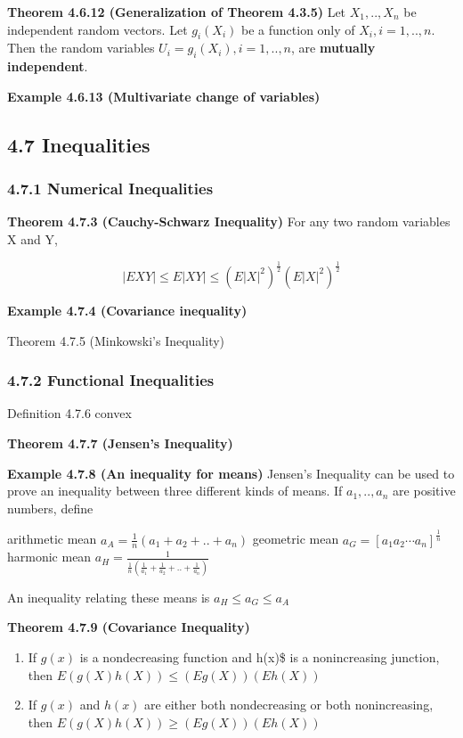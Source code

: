 \documentclass[6pt,Portrait]{article}
\begin{document}
\textbf{Theorem 4.6.12 (Generalization of Theorem 4.3.5)} Let
\(X_1,.., X_n\) be independent random vectors. Let \(g_i(X_i)\) be a
function only of \(X_i,i=1,..,n\). Then the random variables
\(U_i=g_i(X_i),i=1,..,n\), are \textbf{mutually independent}.

\textbf{Example 4.6.13 (Multivariate change of variables)}

\hypertarget{inequalities}{%
\subsection{4.7 Inequalities}\label{inequalities}}

\hypertarget{numerical-inequalities}{%
\subsubsection{4.7.1 Numerical
Inequalities}\label{numerical-inequalities}}

\textbf{Theorem 4.7.3 (Cauchy-Schwarz Inequality)} For any two random
variables X and Y,

\[|EXY|\le E|XY|\le(E|X|^2)^{\frac12}(E|X|^2)^{\frac12}\]

\textbf{Example 4.7.4 (Covariance inequality)}

Theorem 4.7.5 (Minkowski's Inequality)

\hypertarget{functional-inequalities}{%
\subsubsection{4.7.2 Functional
Inequalities}\label{functional-inequalities}}

Definition 4.7.6 convex

\textbf{Theorem 4.7.7 (Jensen's Inequality)}

\textbf{Example 4.7.8 (An inequality for means)} Jensen's Inequality can
be used to prove an inequality between three different kinds of means.
If \(a_1,..,a_n\) are positive numbers, define

arithmetic mean \(a_A=\frac1n(a_1+a_2+..+a_n)\) geometric mean
\(a_G=[a_1a_2\cdots a_n]^{\frac1n}\) harmonic mean
\(a_H=\frac{1}{\frac1n(\frac1{a_1}+\frac1{a_2}+..+\frac1{a_n})}\)

An inequality relating these means is \(a_H\le a_G\le a_A\)

\textbf{Theorem 4.7.9 (Covariance Inequality)}

\begin{enumerate}
\def\labelenumi{\alph{enumi}.}
\item
  If \(g(x)\) is a nondecreasing function and h(x)\$ is a nonincreasing
  junction, then \(E(g(X)h(X))\le(Eg(X))(Eh(X))\)
\item
  If \(g(x)\) and \(h(x)\) are either both nondecreasing or both
  nonincreasing, then \(E(g(X)h(X))\ge(Eg(X))(Eh(X))\)
\end{enumerate}
\end{document}
